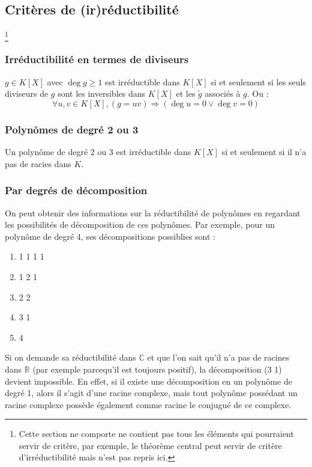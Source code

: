 \documentclass[a4paper,10pt]{article}
\newcommand{\mt}[1]{\widetilde{ #1 }} %
\newcommand{\so}{\Rightarrow} %
\newcommand{\RR}{\mathbb{R}} %
\newcommand{\CC}{\mathbb{C}} %
\newcommand{\mfootnote}[1]{\up{(}\footnote{#1}\up{)}}
\begin{document}
 \subsection{Critères de (ir)réductibilité}
  \mfootnote{Cette section ne comporte ne contient pas tous les éléments qui
  pourraient servir de critère, par exemple, le théorème central peut servir de
  critère d'irréductibilité mais n'est pas repris ici.}
 
  \subsubsection{Irréductibilité en termes de diviseurs}
   $g \in K[X]$ avec $\deg g \ge 1$ est irréductible dans $K[X]$ si et seulement
   si les seuls diviseurs de $g$ sont les inversibles dans $K[X]$ et les
   $\mt{g}$ associés à $g$. Ou :
   $$\forall u,v \in K[X], (g=uv) \so (\deg u=0 \lor \deg v=0)$$

  \subsubsection{Polynômes de degré 2 ou 3}
   Un polynôme de degré 2 ou 3 est irréductible dans $K[X]$ si et seulement si
   il n'a pas de racies dans $K$.
  
  \subsubsection{Par degrés de décomposition}
   On peut obtenir des informations sur la réductibilité de polynômes en
   regardant les possibilités de décomposition de ces polynômes. Par exemple,
   pour un polynôme de degré 4, ses décompositions possiblies sont : 
   \begin{enumerate}
     \item 1 1 1 1
     \item 1 2 1
     \item 2 2
     \item 3 1
     \item 4 
   \end{enumerate}
   Si on demande sa réductibilité dans $\CC$ et que l'on sait qu'il n'a pas de
   racines dans $\RR$ (par exemple parcequ'il est toujours positif), la
   décomposition (3 1) devient impossible. En effet, si il existe une
   décomposition en un polynôme de degré 1, alors il s'agit d'une racine
   complexe, mais tout polynôme possédant un racine complexe possède également
   comme racine le conjugué de ce complexe.
\end{document}

